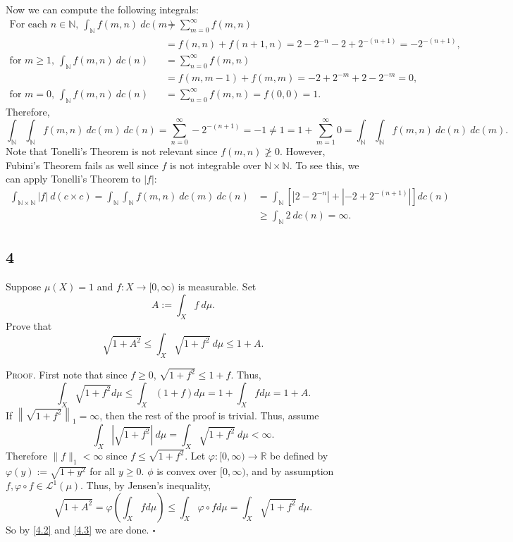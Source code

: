 \documentclass[12pt]{article}
\newcounter{ProofCounter}
\newenvironment{Proof}{\stepcounter{ProofCounter}\textsc{Proof.}}{\hfill$\square$}
\begin{document}
Now we can compute the following integrals:
\begin{align*}
\text{For each $n \in \mathbb{N}$, } \int_{\mathbb{N}}f(m,n)\ dc(m) & = \sum_{m=0}^{\infty}f(m,n) \\
& = f(n,n) + f(n+1,n) = 2 - 2^{-n} - 2 + 2^{-(n+1)} = -2^{-(n+1)}, \\
\text{for $m \geq 1$, } \int_{\mathbb{N}}f(m,n)\ dc(n) & = \sum_{n=0}^{\infty}f(m,n) \\
& = f(m,m-1) + f(m,m) = - 2 + 2^{-m} + 2 - 2^{-m} = 0, \\
\text{for $m = 0$, } \int_{\mathbb{N}}f(m,n)\ dc(n) & = \sum_{n=0}^{\infty}f(m,n) = f(0,0) = 1.
\end{align*}
Therefore,
\[
\int_{\mathbb{N}}\int_{\mathbb{N}}f(m,n)\ dc(m)\ dc(n) = \sum_{n=0}^{\infty}-2^{-(n+1)} = -1 \neq 1 = 1 + \sum_{m=1}^{\infty}0 = 
\int_{\mathbb{N}}\int_{\mathbb{N}}f(m,n)\ dc(n)\ dc(m).
\]
Note that Tonelli's Theorem is not relevant since $f(m,n) \not\geq 0$. However, Fubini's Theorem fails as well since $f$ is not integrable over
$\mathbb{N}\times \mathbb{N}$. To see this, we can apply Tonelli's Theorem to $|f|$:
\begin{align*}
\int_{\mathbb{N}\times\mathbb{N}}|f|\ d(c\times c) = \int_{\mathbb{N}}\int_{\mathbb{N}}f(m,n)\ dc(m)\ dc(n) & = \int_{\mathbb{N}}\left[|2 - 2^{-n}|
+ |-2 + 2^{-(n+1)}|\right]dc(n) \\
& \geq \int_{\mathbb{N}}2\ dc(n) = \infty. 
\end{align*}




\newpage
\subsection*{4}
\begin{tcolorbox}
Suppose $\mu(X) = 1$ and $f : X \rightarrow [0,\infty)$ is measurable. Set 
\[ A := \int_{X}f\ d\mu. \]
Prove that 
\[ \sqrt{1 + A^{2}} \leq \int_{X}\sqrt{1  +f^{2}}\ d\mu \leq 1 + A. \]
\end{tcolorbox}
\begin{Proof}
First note that since $f \geq 0$, $\sqrt{1 + f^{2}} \leq 1 + f$. Thus,
\begin{equation}
\int_{X}\sqrt{1 + f^{2}}d\mu \leq \int_{X}(1 + f)d\mu = 1 + \int_{X}fd\mu = 1 + A.
\label{4.2}
\end{equation}
If $\left\|\sqrt{1 + f^{2}}\right\|_{1} = \infty$, then the rest of the proof is trivial. Thus, assume 
\[ \int_{X}\left|\sqrt{1 + f^{2}}\right|\ d\mu = \int_{X}\sqrt{1 + f^{2}}\ d\mu  < \infty.\] 
Therefore $\|f\|_{1} < \infty$ since $f \leq \sqrt{1 + f^{2}}$.
Let $\varphi : [0,\infty) \rightarrow \mathbb{R}$ be defined by $\varphi(y) := \sqrt{1 + y^{2}}$ for all $y \geq 0$. $\phi$ is convex over $[0,\infty)$,
and by assumption $f, \varphi\circ f \in \mathcal{L}^{1}(\mu)$. Thus, by Jensen's inequality,
\begin{equation}
\sqrt{1 + A^{2}} = \varphi\left( \int_{X}fd\mu \right) \leq \int_{X}\varphi\circ f d\mu = \int_{X}\sqrt{1 + f^{2}}\ d\mu.
\label{4.3}
\end{equation}
So by \eqref{4.2} and \eqref{4.3} we are done.
\end{Proof}
\end{document}
